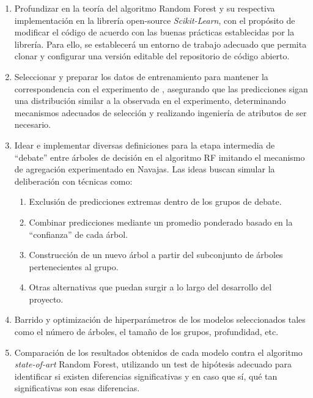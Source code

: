 \begin{enumerate}
    \item Profundizar en la teoría del algoritmo Random Forest y su respectiva implementación en la librería open-source \textit{Scikit-Learn}, con el propósito de modificar el código de acuerdo con las buenas prácticas establecidas por la librería. Para ello, se establecerá un entorno de trabajo adecuado que permita clonar y configurar una versión editable del repositorio de código abierto.
    
    \item Seleccionar y preparar los datos de entrenamiento para mantener la correspondencia con el experimento de \cite{navajasAggregatedKnowledge}, asegurando que las predicciones sigan una distribución similar a la observada en el experimento, determinando mecanismos adecuados de selección y realizando ingeniería de atributos de ser necesario.

    \item Idear e implementar diversas definiciones para la etapa intermedia de “debate” entre árboles de decisión en el algoritmo RF imitando el mecanismo de agregación experimentado en Navajas. Las ideas buscan simular la deliberación con técnicas como:

    \begin{enumerate}
        \item Exclusión de predicciones extremas dentro de los grupos de debate.

        \item Combinar predicciones mediante un promedio ponderado basado en la “confianza” de cada árbol.
        
        \item Construcción de un nuevo árbol a partir del subconjunto de árboles pertenecientes al grupo.
        
        \item Otras alternativas que puedan surgir a lo largo del desarrollo del proyecto.
    \end{enumerate}
    
    \item Barrido y optimización de hiperparámetros de los modelos seleccionados tales como el número de árboles, el tamaño de los grupos, profundidad, etc.

    \item Comparación de los resultados obtenidos de cada modelo contra el algoritmo \textit{state-of-art} Random Forest, utilizando un test de hipótesis adecuado para identificar si existen diferencias significativas y en caso que sí, qué tan significativas son esas diferencias.
\end{enumerate}